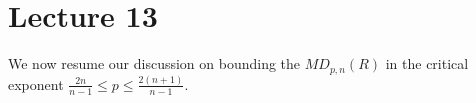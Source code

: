 \section{Lecture 13}

We now resume our discussion on bounding the $MD_{p,n}(R)$ in the critical exponent $\frac{2n}{n-1}\leq p\leq\frac{2(n+1)}{n-1}$.

